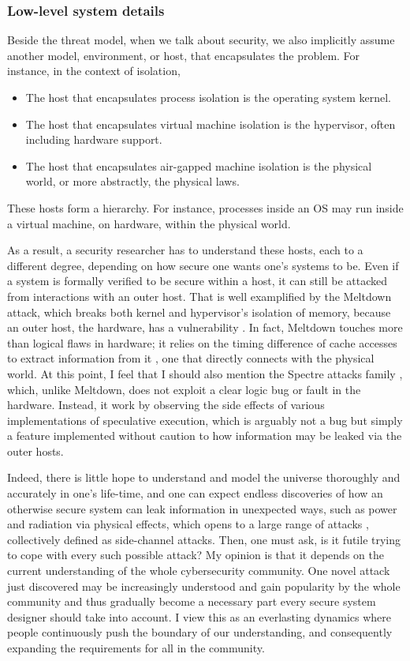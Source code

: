 \documentclass[10pt]{article}
\begin{document}
\subsubsection{Low-level system details} \label{sec.low.level}
Beside the threat model, when we talk about security, we also implicitly assume
another model, environment, or host, that encapsulates the problem. For
instance, in the context of isolation, 
\begin{itemize}
	\item The host that encapsulates process isolation is the operating system
		kernel.
	\item The host that encapsulates virtual machine isolation is the
		hypervisor, often including hardware support.
	\item The host that encapsulates air-gapped machine isolation is the
		physical world, or more abstractly, the physical laws.
\end{itemize} 
These hosts form a hierarchy. For instance, processes inside an OS may run
inside a virtual machine, on hardware, within the physical world.

As a result, a security researcher has to understand these hosts, each to a
different degree, depending on how secure one wants one's systems to be. Even if
a system is formally verified to be secure within a host, it can still be
attacked from interactions with an outer host. That is well examplified by
the Meltdown attack, which breaks both kernel and hypervisor's isolation of
memory, because an outer host, the hardware, has a vulnerability
\cite{meltdown}. In fact, Meltdown touches more than logical flaws in hardware;
it relies on the timing difference of cache accesses to extract information
from it \cite{flush.reload}, one that directly connects with the physical
world. At this point, I feel that I should also mention the Spectre attacks
family \cite{spectre}, which, unlike Meltdown, does not exploit a clear logic
bug or fault in the hardware. Instead, it work by observing the side effects
of various implementations of speculative execution, which is arguably not a
bug but simply a feature implemented without caution to how information may be
leaked via the outer hosts.

Indeed, there is little hope to understand and model the universe thoroughly
and accurately in one's life-time, and one can expect endless discoveries of
how an otherwise secure system can leak information in unexpected ways, such as
power and radiation via physical effects, which opens to a large range of
attacks \cite{side.channel.1, side.channel.2, side.channel.3, flush.reload},
collectively defined as side-channel attacks.  Then, one must ask, is it futile
trying to cope with every such possible attack? My opinion is that it depends
on the current understanding of the whole cybersecurity community. One novel
attack just discovered may be increasingly understood and gain popularity by
the whole community and thus gradually become a necessary part every secure
system designer should take into account. I view this as an everlasting
dynamics where people continuously push the boundary of our understanding, and
consequently expanding the requirements for all in the community.
\end{document}
